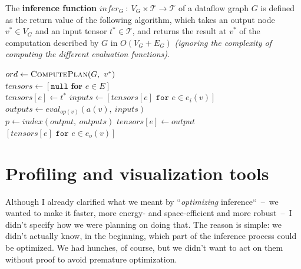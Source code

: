 \documentclass[11pt]{article}
\begin{document}
\bigskip
\begin{definition}
The \textbf{inference function} $infer_G\ : \ V_G \times \mathcal{T} \rightarrow \mathcal{T}$ of a dataflow graph $G$ is defined as the return value of the following algorithm, which takes an output node $v^* \in V_G$ and an input tensor $t^* \in \mathcal{T}$, and returns the result at $v^*$ of the computation described by $G$ in $O(V_G + E_G)$ \textit{(ignoring the complexity of computing the different evaluation functions)}.\\

\begin{algorithmic}[1]
    \State $ord \gets \textsc{ComputePlan}(G,\ v^*)$\\
    
    \State {}
    \State $tensors \gets [\texttt{null} \textbf{ for } e \in E]$\\
    
                \State $tensors[e] \gets t^*$
            \EndFor
        \Else
            \State $inputs \gets [tensors[e] \texttt{ for } e \in e_i(v)]$
            \State $outputs \gets eval_{op(v)}(a(v),\ inputs)$\\
            
            \State {}
                \State $p \gets index(output,\ outputs)$
                    \State $tensors[e] \gets output$
                \EndFor
            \EndFor
        \EndIf\\

        \State {}
            \State \Return $[tensors[e] \texttt{ for } e \in e_o(v)]$
        \EndIf
    \EndFor
\EndFunction
\end{algorithmic}

\end{definition}

\newpage
\section{Profiling and visualization tools}

Although I already clarified what we meant by ``\textit{optimizing} inference``~--~we wanted to make it faster, more energy- and space-efficient and more robust~--~I didn't specify how we were planning on doing that. The reason is simple: we didn't actually know, in the beginning, which part of the inference process could be optimized. We had hunches, of course, but we didn't want to act on them without proof to avoid premature optimization.
\end{document}

